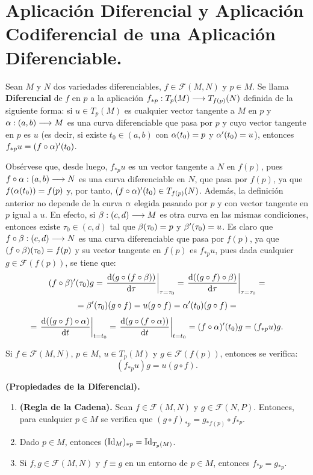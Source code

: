 \documentclass[Cursovd_portada.tex]{subfiles}
\begin{document}
\section{Aplicación Diferencial y Aplicación Co\-di\-fe\-ren\-cial de una Aplicación Diferenciable.}
\begin{defi}
Sean $M$ y $N$ dos variedades diferenciables, $f\in\mathcal{F}(M,N)$ y $p\in M$. Se llama {\bf Diferencial} de $f$
en $p$ a la aplicación $f_{*p}:T_p(M)\longrightarrow T_{f(p)}(N)$ definida de la siguiente forma: si $u\in T_p(M)$ es
cualquier vector tangente a $M$ en $p$ y $\alpha:(a,b)\longrightarrow M$ es una curva diferenciable que pasa por $p$ y cuyo vector
tangente en $p$ es $u$ (es decir, si existe $t_0\in (a,b)$ con $\alpha(t_0)=p$ y $\alpha'(t_0)=u$), entonces
$f_{*p}u=(f\circ\alpha)'(t_0)$.
\end{defi}
Obsérvese que, desde luego, $f_{*p}u$ es un vector tangente a $N$ en $f(p)$, pues $f\circ\alpha:(a,b)\longrightarrow N$ es una
curva diferenciable en $N$, que pasa por $f(p)$, ya que $f(\alpha(t_0))=f(p)$ y, por tanto, $(f\circ\alpha)'(t_0)\in
T_{f(p)}(N)$. Además, la definición anterior no depende de la curva $\alpha$ elegida pasando por $p$ y con vector
tangente en $p$ igual a $u$. En efecto, si $\beta:(c,d)\longrightarrow M$ es otra curva en las mismas condiciones, entonces
existe $\tau_0\in(c,d)$ tal que $\beta(\tau_0)=p$ y $\beta'(\tau_0)=u$. Es claro que $f\circ\beta:(c,d)\longrightarrow N$ es una curva
diferenciable que pasa por $f(p)$, ya que $(f\circ\beta)(\tau_0)=f(p)$ y su vector tangente en $f(p)$ es $f_{*p}u$,
pues dada cualquier $g\in\mathcal{F}(f(p))$, se tiene que:
$$(f\circ\beta)'(\tau_0)g=\left.\displaystyle{\frac{{\rm d} (g\circ(f\circ\beta))}{{\rm d} \tau}}\right|_{\tau=\tau_0}=
\left.\displaystyle{\frac{{\rm d} ((g\circ f)\circ\beta)}{{\rm d} \tau}}\right|_{\tau=\tau_0}=$$
$$=\beta'(\tau_0)(g\circ f)=u(g\circ f)=\alpha'(t_0)(g\circ f)=$$
$$=\left.\displaystyle{\frac{{\rm d} ((g\circ f)\circ\alpha)}{{\rm d} t}}\right|_{t=t_0}=\left.\displaystyle{\frac{{\rm d} (g\circ(f\circ\alpha))}{{\rm d} t}}\right|_{t=t_0}=
(f\circ\alpha)'(t_0)g=(f_{*p}u)g.$$
\begin{prop}
Si $f\in\mathcal{F}(M,N)$, $p\in M$, $u\in T_p(M)$ y $g\in\mathcal{F}(f(p))$, entonces se verifica:
$$(f_{*p}u)g=u(g\circ f).$$
\end{prop}
\begin{prop}
{\bf (Propiedades de la Diferencial).}
\begin{enumerate}
\item {\bf (Regla de la Cadena).} Sean $f\in\mathcal{F}(M,N)$ y $g\in\mathcal{F}(N,P)$. Entonces, para
cualquier $p\in M$ se verifica que $(g\circ f)_{*p}=g_{*f(p)}\circ f_{*p}$.
\item Dado $p\in M$, entonces $({\rm Id}_M)_{*p}={\rm Id}_{T_p(M)}$.
\item Si $f,g\in\mathcal{F}(M,N)$ y $f\equiv g$ en un entorno de $p\in M$, entonces $f_{*p}=g_{*p}$.
\end{enumerate}
\end{prop}
\end{document}
